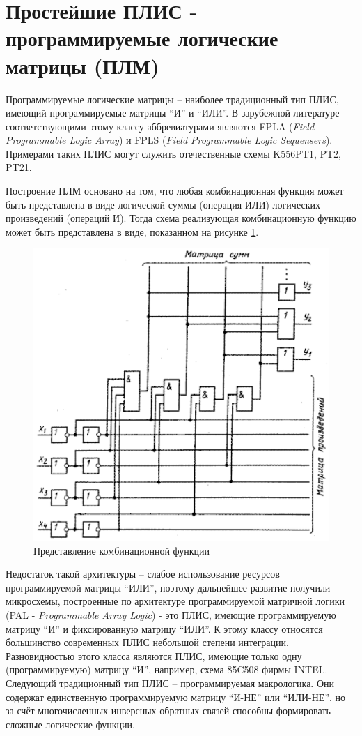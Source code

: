 \section{Простейшие ПЛИС - программируемые логические матрицы (ПЛМ)}

Программируемые логические матрицы -- наиболее традиционный тип ПЛИС, имеющий
программируемые матрицы ``И'' и ``ИЛИ''. В зарубежной литературе
соответствующими этому классу аббревиатурами являются FPLA (\emph{Field
Programmable Logic Array}) и FPLS (\emph{Field Programmable Logic Sequensers}).
Примерами таких ПЛИС могут служить отечественные схемы K556PT1, PT2, PT21.

Построение ПЛМ основано на том, что любая комбинационная функция может быть
представлена в виде логической суммы (операция ИЛИ) логических произведений
(операций И). Тогда схема реализующая комбинационную функцию может быть
представлена в виде, показанном на рисунке \ref{pic_2}.
\begin{figure}[h!]
    \centering
    \includegraphics[width=.6\textwidth]{pld_02}
    \caption{Представление комбинационной функции}
    \label{pic_2}
\end{figure}

Недостаток такой архитектуры -- слабое использование ресурсов программируемой
матрицы ``ИЛИ'', поэтому дальнейшее развитие получили микросхемы, построенные
по архитектуре программируемой матричной логики (PAL - \emph{Programmable Array
Logic}) - это ПЛИС, имеющие программируемую матрицу ``И'' и фиксированную
матрицу ``ИЛИ''. К этому классу относятся большинство современных ПЛИС
небольшой степени интеграции.  Разновидностью этого класса
являются ПЛИС, имеющие только одну (программируемую) матрицу ``И'', например,
схема 85C508 фирмы INTEL. Следующий традиционный тип ПЛИС -- программируемая
макрологика. Они содержат единственную программируемую матрицу ``И-НЕ'' или
``ИЛИ-НЕ'', но за счёт многочисленных инверсных обратных связей способны
формировать сложные логические функции. 

